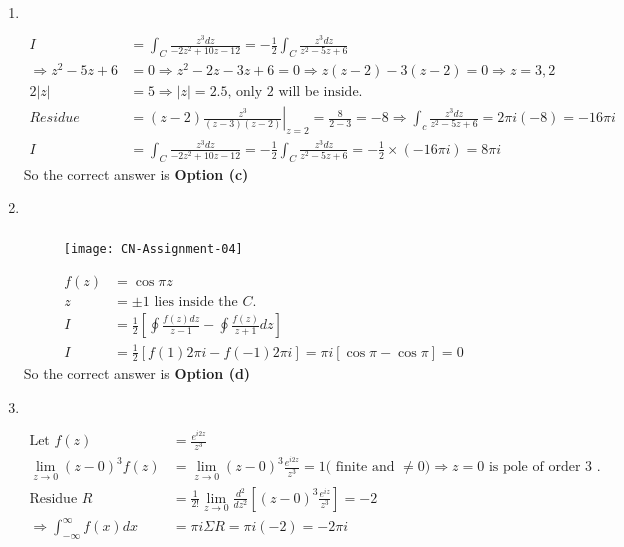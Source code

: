 \begin{enumerate}
\item $\left. \right. $
\begin{answer}
	\begin{align*}
	I&=\int_{C} \frac{z^{3} d z}{-2 z^{2}+10 z-12}=-\frac{1}{2} \int_{C} \frac{z^{3} d z}{z^{2}-5 z+6}\\
	\Rightarrow z^{2}-5 z+6&=0 \Rightarrow z^{2}-2 z-3 z+6=0 \Rightarrow z(z-2)-3(z-2)=0 \Rightarrow z=3,2\\
	2|z|&=5 \Rightarrow|z|=2.5\text{, only 2 will be inside.}\\
	Residue &=\left.(z-2) \frac{z^{3}}{(z-3)(z-2)}\right|_{z=2}=\frac{8}{2-3}=-8 \Rightarrow \int_{c} \frac{z^{3} d z}{z^{2}-5 z+6}=2 \pi i(-8)=-16 \pi i\\
	I&=\int_{C} \frac{z^{3} d z}{-2 z^{2}+10 z-12}=-\frac{1}{2} \int_{C} \frac{z^{3} d z}{z^{2}-5 z+6}=-\frac{1}{2} \times(-16 \pi i)=8 \pi i
	\end{align*}
	So the correct answer is \textbf{Option (c)}
\end{answer}
\item $\left. \right. $
\begin{answer}$\left. \right. $
	\begin{figure}[H]
		\centering
		\texttt{[image: CN-Assignment-04]}
	\end{figure}
	\begin{align*}
	f(z)&=\cos \pi z\\
	z&=\pm 1\text{ lies inside the $C$.}\\
	I&=\frac{1}{2}\left[\oint \frac{f(z) d z}{z-1}-\oint \frac{f(z)}{z+1} d z\right]\\
	I&=\frac{1}{2}[f(1) 2 \pi i-f(-1) 2 \pi i]=\pi i[\cos \pi-\cos \pi]=0
	\end{align*}
	So the correct answer is \textbf{Option (d)}
\end{answer}
\item $\left. \right. $
\begin{answer}
	\begin{align*}
	\text{Let }f(z)&=\frac{e^{i 2 z}}{z^{3}}\\
	\lim _{z \rightarrow 0}(z-0)^{3} f(z)&=\lim _{z \rightarrow 0}(z-0)^{3} \frac{e^{i 2 z}}{z^{3}}=1\text{( finite and $\neq 0) \Rightarrow z=0$ is pole of order 3 .}\\
	\text{Residue }R&=\frac{1}{2 !} \lim _{z \rightarrow 0} \frac{d^{2}}{d z^{2}}\left[(z-0)^{3} \frac{e^{i z}}{z^{3}}\right]=-2\\
	\Rightarrow \int_{-\infty}^{\infty} f(x) d x&=\pi i \Sigma R=\pi i(-2)=-2 \pi i 

\end{align*}
\end{answer}
\end{enumerate}
